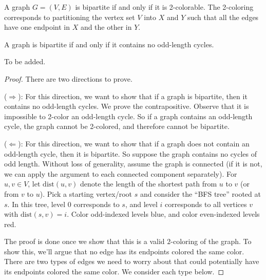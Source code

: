 \begin{note}
\label{note:2-colorability-is-equivalent-to-bipartiteness}
A graph $G=(V,E)$ is bipartite if and only if it is 2-colorable. The 2-coloring corresponds to partitioning the vertex set $V$ into $X$ and $Y$ such that all the edges have one endpoint in $X$ and the other in $Y$.

\end{note}

\begin{flex}
\label{grp:theorem:Characterization-of-bipartite-graphs}

\begin{theorem}
\label{theorem:Characterization-of-bipartite-graphs}
A graph is bipartite if and only if it contains no odd-length cycles.

\end{theorem}

\begin{gram}
\label{grm:matchings-in-graphs::proof-visualization}
To be added.

\end{gram}

\begin{proof}
\label{prf:matchings-in-graphs::directions}
There are two directions to prove.

\noindent
($\Longrightarrow$): For this direction, we want to show that if a graph is bipartite, then it contains no odd-length cycles. We prove the contrapositive. Observe that it is impossible to 2-color an odd-length cycle. So if a graph contains an odd-length cycle, the graph cannot be 2-colored, and therefore cannot be bipartite.

\noindent
($\Longleftarrow$): For this direction, we want to show that if a graph does not contain an odd-length cycle, then it is bipartite. So suppose the graph contains no cycles of odd length. Without loss of generality, assume the graph is connected (if it is not, we can apply the argument to each connected component separately). For $u,v \in V$, let $\text{dist}(u,v)$ denote the length of the shortest path from $u$ to $v$ (or from $v$ to $u$). Pick a starting vertex/root $s$ and consider the ``BFS tree'' rooted at $s$. In this tree, level 0 corresponds to $s$, and level $i$ corresponds to all vertices $v$ with $\text{dist}(s,v) = i$. Color odd-indexed levels blue, and color even-indexed levels red. 

The proof is done once we show that this is a valid $2$-coloring of the graph. To show this, we'll argue that no edge has its endpoints colored the same color. There are two types of edges we need to worry about that could potentially have its endpoints colored the same color. We consider each type below.


\end{proof}
\end{flex}
